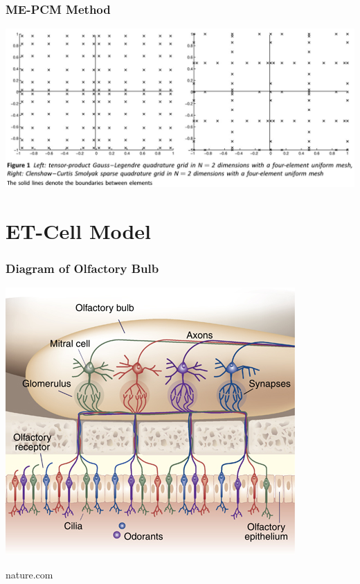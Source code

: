 \documentclass{beamer}
\theoremstyle{plain}
\theoremstyle{definition}
\begin{document}
\begin{frame}\frametitle{ME-PCM Method}
  \begin{center}
    \includegraphics[scale = .25]{grid.png}
  \end{center}
\end{frame}

\section{ET-Cell Model}

\begin{frame}\frametitle{Diagram of Olfactory Bulb}
  \begin{center}
   \includegraphics[scale = .8]{glomerularLayer.jpg}
  \end{center}
  nature.com
\end{frame}
\end{document}
